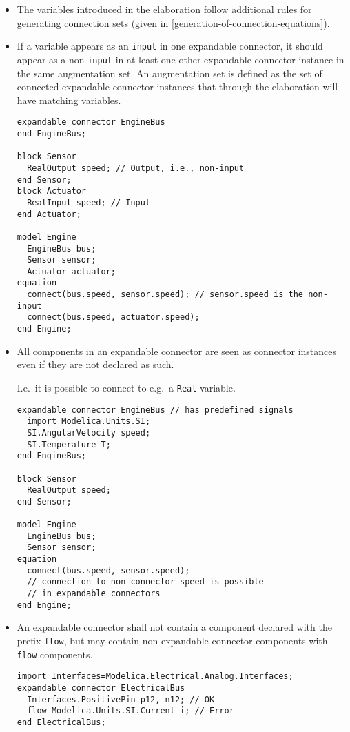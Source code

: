 \begin{itemize}
\item
  The variables introduced in the elaboration follow additional rules for generating connection sets (given in \cref{generation-of-connection-equations}).

\item
  If a variable appears as an \lstinline!input! in one expandable connector, it should appear as a non-\lstinline!input! in at least one other expandable connector instance in the same augmentation set.
  An augmentation set is defined as the set of connected expandable connector instances that through the elaboration will have matching variables.
\begin{example}
\begin{lstlisting}[language=modelica]
expandable connector EngineBus
end EngineBus;

block Sensor
  RealOutput speed; // Output, i.e., non-input
end Sensor;
block Actuator
  RealInput speed; // Input
end Actuator;

model Engine
  EngineBus bus;
  Sensor sensor;
  Actuator actuator;
equation
  connect(bus.speed, sensor.speed); // sensor.speed is the non-input
  connect(bus.speed, actuator.speed);
end Engine;
\end{lstlisting}
\end{example}

\item
  All components in an expandable connector are seen as connector instances even if they are not declared as such.
  \begin{nonnormative}
  I.e.\ it is possible to connect to e.g.\ a \lstinline!Real! variable.
  \end{nonnormative}
\begin{example}
\begin{lstlisting}[language=modelica]
expandable connector EngineBus // has predefined signals
  import Modelica.Units.SI;
  SI.AngularVelocity speed;
  SI.Temperature T;
end EngineBus;

block Sensor
  RealOutput speed;
end Sensor;

model Engine
  EngineBus bus;
  Sensor sensor;
equation
  connect(bus.speed, sensor.speed);
  // connection to non-connector speed is possible
  // in expandable connectors
end Engine;
\end{lstlisting}
\end{example}

\item
  An expandable connector shall not contain a component declared with the prefix \lstinline!flow!, but may contain non-expandable connector components with \lstinline!flow! components.
\begin{example}
\begin{lstlisting}[language=modelica]
import Interfaces=Modelica.Electrical.Analog.Interfaces;
expandable connector ElectricalBus
  Interfaces.PositivePin p12, n12; // OK
  flow Modelica.Units.SI.Current i; // Error
end ElectricalBus;


\end{lstlisting}
\end{example}
\end{itemize}
